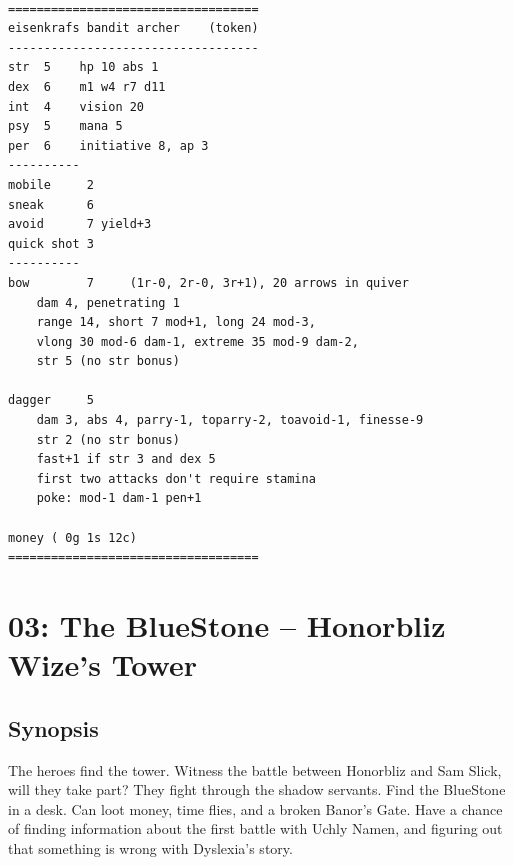 \documentclass[11pt, twoside, titlepage, a4paper]{report}
\renewcommand{\chaptermark}[1]{\markboth{#1}{}}
\begin{document}
\

\goodbreak \begin{samepage} \small \begin{verbatim}
===================================
eisenkrafs bandit archer    (token)
-----------------------------------
str  5    hp 10 abs 1
dex  6    m1 w4 r7 d11
int  4    vision 20
psy  5    mana 5
per  6    initiative 8, ap 3
----------
mobile     2
sneak      6
avoid      7 yield+3
quick shot 3
----------
bow        7     (1r-0, 2r-0, 3r+1), 20 arrows in quiver
    dam 4, penetrating 1
    range 14, short 7 mod+1, long 24 mod-3,
    vlong 30 mod-6 dam-1, extreme 35 mod-9 dam-2,
    str 5 (no str bonus)

dagger     5
    dam 3, abs 4, parry-1, toparry-2, toavoid-1, finesse-9
    str 2 (no str bonus)
    fast+1 if str 3 and dex 5
    first two attacks don't require stamina
    poke: mod-1 dam-1 pen+1

money ( 0g 1s 12c)
===================================
\end{verbatim} \normalsize \end{samepage}


\flushbottom




















\clearpage
{}
\section*{03: The BlueStone -- Honorbliz Wize's Tower}
\chaptermark{blue stone}


\subsection*{Synopsis}
The heroes find the tower. Witness the battle between Honorbliz and Sam Slick, will they take part? They fight through the shadow servants. Find the BlueStone in a desk. Can loot money, time flies, and a broken Banor's Gate. Have a chance of finding information about the first battle with Uchly Namen, and figuring out that something is wrong with Dyslexia's story.
\end{document}

